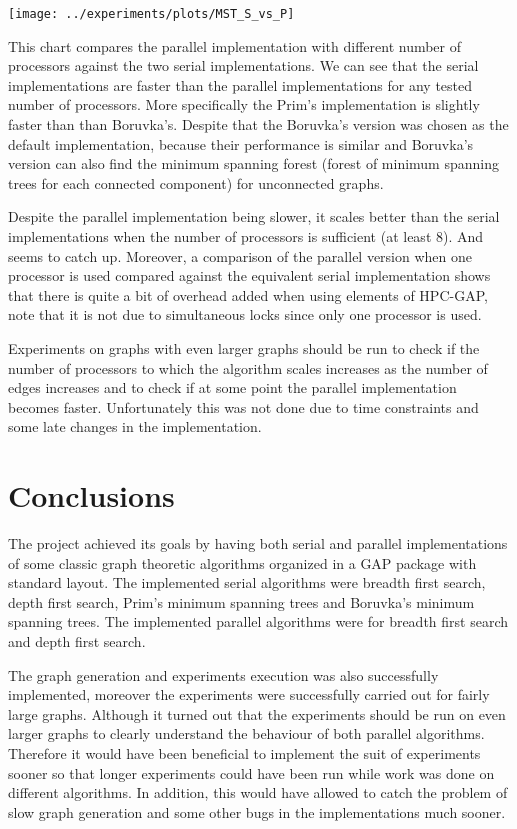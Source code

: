 \documentclass{report}
\theoremstyle{plain}
\theoremstyle{definition}
\theoremstyle{remark}
\begin{document}
\texttt{[image: ../experiments/plots/MST\_S\_vs\_P]}

This chart compares the parallel implementation with different number of processors against the two serial implementations. We can see that the serial implementations are faster than the parallel implementations for any tested number of processors. More specifically the Prim's implementation is slightly faster than than Boruvka's. Despite that the Boruvka's version was chosen as the default implementation, because their performance is similar and Boruvka's version can also find the minimum spanning forest (forest of minimum spanning trees for each connected component) for unconnected graphs.

Despite the parallel implementation being slower, it scales better than the serial implementations when the number of processors is sufficient (at least 8). And seems to catch up. Moreover, a comparison of the parallel version when one processor is used compared against the equivalent serial implementation shows that there is quite a bit of overhead added when using elements of HPC-GAP, note that it is not due to simultaneous locks since only one processor is used.

Experiments on graphs with even larger graphs should be run to check if the number of processors to which the algorithm scales increases as the number of edges increases and to check if at some point the parallel implementation becomes faster. Unfortunately this was not done due to time constraints and some late changes in the implementation.

\chapter{Conclusions}

The project achieved its goals by having both serial and parallel implementations of some classic graph theoretic algorithms organized in a GAP package with standard layout. The implemented serial algorithms were breadth first search, depth first search, Prim's minimum spanning trees and Boruvka's minimum spanning trees. The implemented parallel algorithms were for breadth first search and depth first search.

The graph generation and experiments execution was also successfully implemented, moreover the experiments were successfully carried out for fairly large graphs. Although it turned out that the experiments should be run on even larger graphs to clearly understand the behaviour of both parallel algorithms. Therefore it would have been beneficial to implement the suit of experiments sooner so that longer experiments could have been run while work was done on different algorithms. In addition, this would have allowed to catch the problem of slow graph generation and some other bugs in the implementations much sooner.
\end{document}
